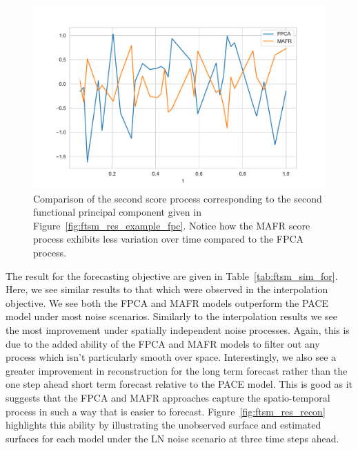 \begin{figure}[htbp!] 
	\centering    
	\includegraphics[width=1.0\textwidth]{ftsm_res_zeta_example}
	\caption[Comparison of the second score process under FPCA and MAFR models.]{Comparison of the second score process corresponding to the second functional principal component given in Figure~\ref{fig:ftsm_res_example_fpc}. Notice how the MAFR score process exhibits less variation over time compared to the FPCA process.}
	\label{fig:ftsm_res_example_zeta}
\end{figure}

The result for the forecasting objective are given in Table~\ref{tab:ftsm_sim_for}.
Here, we see similar results to that which were observed in the interpolation objective.
We see both the FPCA and MAFR models outperform the PACE model under most noise scenarios.
Similarly to the interpolation results we see the most improvement under spatially independent noise processes.
Again, this is due to the added ability of the FPCA and MAFR models to filter out any process which isn't particularly smooth over space. 
Interestingly, we also see a greater improvement in reconstruction for the long term forecast rather than the one step ahead short term forecast relative to the PACE model.
This is good as it suggests that the FPCA and MAFR approaches capture the spatio-temporal process in such a way that is easier to forecast. 
Figure~\ref{fig:ftsm_res_recon} highlights this ability by illustrating the unobserved surface and estimated surfaces for each model under the LN noise scenario at three time steps ahead.

